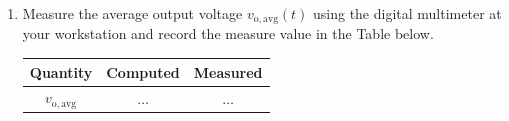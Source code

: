 \begin{enumerate}
\item Measure the average output voltage $v_{\mathrm{o,avg}}(t)$ using the digital multimeter at your workstation and record the measure value in the Table below.
  \begin{center}
    \begin{tabular}{c|c|c}
      \toprule
      Quantity &  Computed & Measured\\
      \toprule
      $v_{\mathrm{o,avg}}$ & $\ldots$ & $\ldots$\\
      \bottomrule
    \end{tabular}    
  \end{center}  


   
\end{enumerate}
 

